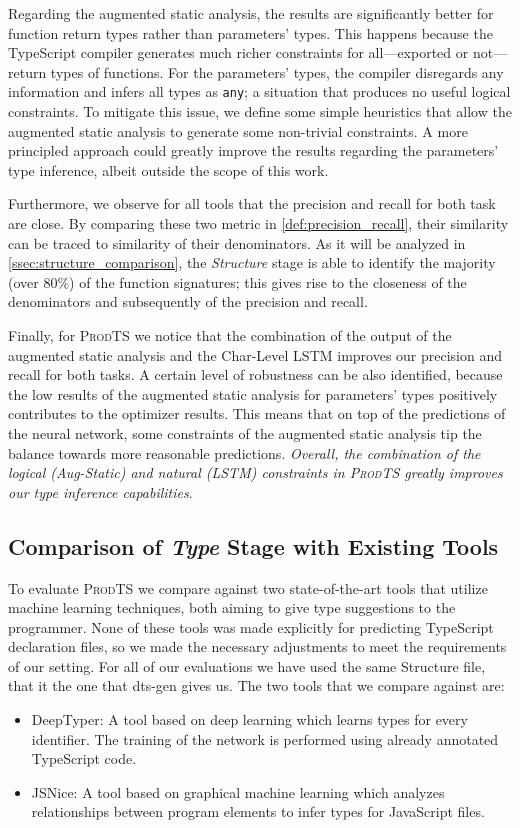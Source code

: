 \documentclass[sigplan,10pt,anonymous]{acmart} %
\newcommand{\prodts}{\textsc{ProdTS}\xspace}
\theoremstyle{plain}
\theoremstyle{remark}
\theoremstyle{definition}
\begin{document}
Regarding the augmented static analysis, the results are significantly better for function return types rather than parameters' types.
This happens because the TypeScript compiler generates much richer constraints for all---exported or not---return types of functions.
For the parameters' types, the compiler disregards any information and infers all types as \texttt{any}; a situation that produces no useful logical constraints.
To mitigate this issue, we define some simple heuristics that allow the augmented static analysis to generate some non-trivial constraints.
A more principled approach could greatly improve the results regarding the parameters' type inference, albeit outside the scope of this work.

Furthermore, we observe for all tools that the precision and recall for both task are close.
By comparing these two metric in \cref{def:precision_recall}, their similarity can be traced to similarity of their denominators.
As it will be analyzed in \cref{ssec:structure_comparison}, the \textit{Structure} stage is able to identify the majority (over $80\%$) of the function signatures; this gives rise to the closeness of the denominators and subsequently of the precision and recall.

Finally, for \prodts we notice that the combination of the output of the augmented static analysis and the Char-Level LSTM improves our precision and recall for both tasks.
A certain level of robustness can be also identified, because the low results of the augmented static analysis for parameters' types positively contributes to the optimizer results.
This means that on top of the predictions of the neural network, some constraints of the augmented static analysis tip the balance towards more reasonable predictions.
\textit{Overall, the combination of the logical (Aug-Static) and natural (LSTM) constraints in \prodts greatly improves our type inference capabilities}.

\subsection{Comparison of \textit{Type} Stage with Existing Tools}

To evaluate \prodts we compare against two state-of-the-art tools that utilize machine learning techniques, both aiming to give type suggestions to the programmer.
None of these tools was made explicitly for predicting TypeScript declaration files, so we made the necessary adjustments to meet the requirements of our setting.
For all of our evaluations we have used the same Structure file, that it the one that dts-gen gives us.
The two tools that we compare against are:
\begin{itemize}[label={\tiny$\bullet$}]
  \item DeepTyper: A tool based on deep learning which learns types for every identifier.
        The training of the network is performed using already annotated TypeScript code.

  \item JSNice: A tool based on graphical machine learning which analyzes relationships between program elements to infer types for JavaScript files.
\end{itemize}
\end{document}

